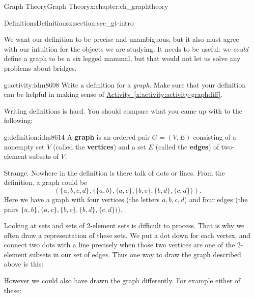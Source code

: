 \documentclass[oneside,10pt,]{book}
\newcommand{\terminology}[1]{\textbf{#1}}
\numberwithin{equation}{chapter}
\newcommand{\vtx}[2]{node[fill,circle,inner sep=0pt, minimum size=4pt,label=#1:#2]{}}
\newcommand{\vr}[1]{\vtx{right}{#1}}
\newcommand{\vl}[1]{\vtx{left}{#1}}
\begin{document}
\begin{chapterptx}{Graph Theory}{}{Graph Theory}{}{}{x:chapter:ch_graphtheory}
\begin{sectionptx}{Definitions}{}{Definitions}{}{}{x:section:sec_gt-intro}
\par
We want our definition to be precise and unambiguous, but it also must agree with our intuition for the objects we are studying.  It needs to be useful: we \emph{could} define a graph to be a six legged mammal, but that would not let us solve any problems about bridges.%
\begin{activity}{}{g:activity:idm8608}%
Write a definition for a \emph{graph}.  Make sure that your definition can be helpful in making sense of \hyperref[x:activity:activity-graphdiff]{Activity~\ref{x:activity:activity-graphdiff}}.%
\end{activity}
Writing definitions is hard.  You should compare what you came up with to the following:%
\begin{definition}{}{g:definition:idm8614}%
A \terminology{graph} is an ordered pair \(G = (V, E)\) consisting of a nonempty set \(V\) (called the \terminology{vertices}) and a set \(E\) (called the \terminology{edges}) of two-element subsets of \(V\).%
\end{definition}
Strange.  Nowhere in the definition is there talk of dots or lines.  From the definition, a graph could be%
\begin{equation*}
(\{a,b,c,d\}, \{\{a,b\}, \{a,c\}, \{b,c\}, \{b,d\}, \{c,d\}\}).
\end{equation*}
Here we have a graph with four vertices  (the letters \(a, b, c, d\)) and four edges (the pairs \(\{a,b\}, \{a,c\}, \{b,c\}, \{b,d\}, \{c,d\})\)).%
\par
Looking at sets and sets of 2-element sets is difficult to process.  That is why we often draw a representation of these sets.  We put a dot down for each vertex, and connect two dots with a line precisely when those two vertices are one of the 2-element subsets in our set of edges.  Thus one way to draw the graph described above is this:%
\begin{sidebyside}{1}{0.375}{0.375}{0}%
\begin{sbspanel}{0.25}%
\resizebox{\linewidth}{!}{%
\begin{tikzpicture}[scale=0.7]
   \draw  (-1,1) \vl{\(a\)} -- (1,1) \vr{\(b\)} (-1,1) -- (-1,-1) \vl{\(c\)} -- (1,-1) \vr{\(d\)} -- (1,1) -- (-1,-1);
 \end{tikzpicture}
}%
\end{sbspanel}%
\end{sidebyside}%
\par
However we could also have drawn the graph differently. For example either of these:%
\begin{sidebyside}{2}{0.1375}{0.1375}{0.275}%

\end{sidebyside}
\end{sectionptx}
\end{chapterptx}
\end{document}
